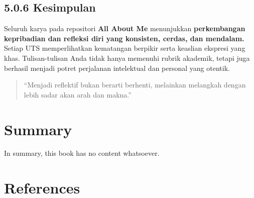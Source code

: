 \documentclass[
  letterpaper,
  DIV=11,
  numbers=noendperiod]{scrreprt}
\begin{document}
\section{5.0.6 Kesimpulan}\label{kesimpulan}

Seluruh karya pada repositori \textbf{All About Me} menunjukkan
\textbf{perkembangan kepribadian dan refleksi diri yang konsisten,
cerdas, dan mendalam.} Setiap UTS memperlihatkan kematangan berpikir
serta keaslian ekspresi yang khas. Tulisan-tulisan Anda tidak hanya
memenuhi rubrik akademik, tetapi juga berhasil menjadi potret perjalanan
intelektual dan personal yang otentik.

\begin{quote}
``Menjadi reflektif bukan berarti berhenti, melainkan melangkah dengan
lebih sadar akan arah dan makna.''
\end{quote}


\chapter{Summary}\label{summary}

In summary, this book has no content whatsoever.


\chapter*{References}\label{references}


\label{refs}
\end{document}
